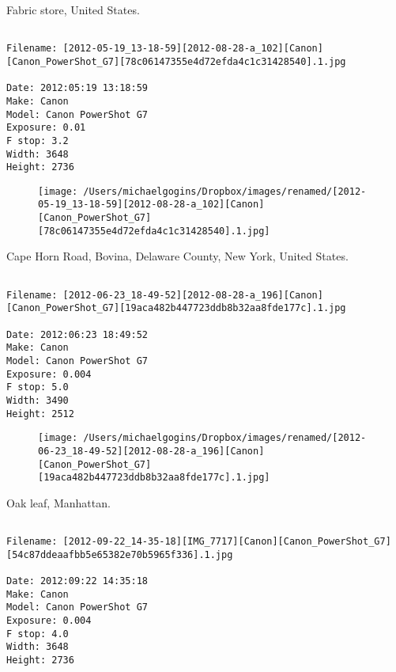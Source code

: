 \documentclass[11pt,letter,DIV=14,paper=landscape]{scrbook}
\begin{document}
\clearpage
\noindent Fabric store, United States.
\noindent
\begin{lstlisting}

Filename: [2012-05-19_13-18-59][2012-08-28-a_102][Canon][Canon_PowerShot_G7][78c06147355e4d72efda4c1c31428540].1.jpg

Date: 2012:05:19 13:18:59
Make: Canon
Model: Canon PowerShot G7
Exposure: 0.01
F stop: 3.2
Width: 3648
Height: 2736
\end{lstlisting}
\clearpage

\begin{figure}
\texttt{[image: /Users/michaelgogins/Dropbox/images/renamed/[2012-05-19\_13-18-59][2012-08-28-a\_102][Canon][Canon\_PowerShot\_G7][78c06147355e4d72efda4c1c31428540].1.jpg]}
\end{figure}
    
\clearpage
\noindent Cape Horn Road, Bovina, Delaware County, New York, United States.
\noindent
\begin{lstlisting}

Filename: [2012-06-23_18-49-52][2012-08-28-a_196][Canon][Canon_PowerShot_G7][19aca482b447723ddb8b32aa8fde177c].1.jpg

Date: 2012:06:23 18:49:52
Make: Canon
Model: Canon PowerShot G7
Exposure: 0.004
F stop: 5.0
Width: 3490
Height: 2512
\end{lstlisting}
\clearpage

\begin{figure}
\texttt{[image: /Users/michaelgogins/Dropbox/images/renamed/[2012-06-23\_18-49-52][2012-08-28-a\_196][Canon][Canon\_PowerShot\_G7][19aca482b447723ddb8b32aa8fde177c].1.jpg]}
\end{figure}
    
\clearpage
\noindent Oak leaf, Manhattan.
\noindent
\begin{lstlisting}

Filename: [2012-09-22_14-35-18][IMG_7717][Canon][Canon_PowerShot_G7][54c87ddeaafbb5e65382e70b5965f336].1.jpg

Date: 2012:09:22 14:35:18
Make: Canon
Model: Canon PowerShot G7
Exposure: 0.004
F stop: 4.0
Width: 3648
Height: 2736
\end{lstlisting}
\clearpage
\end{document}
